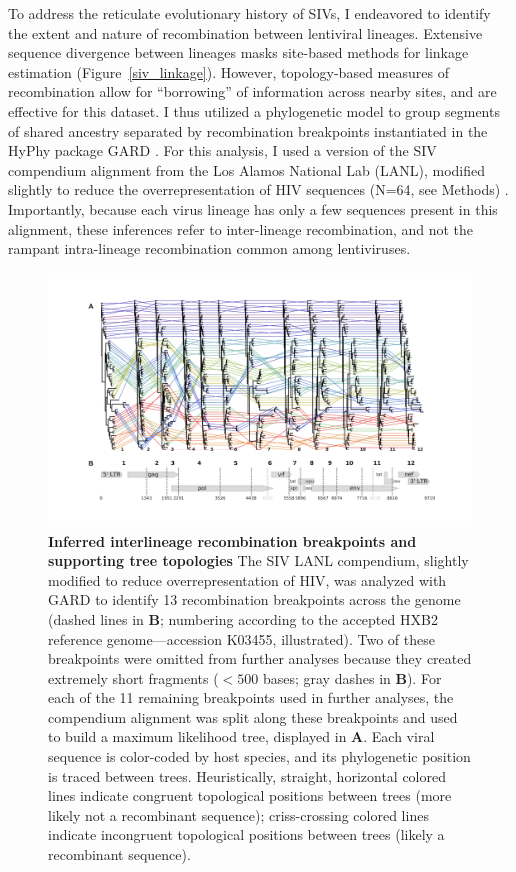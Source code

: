 To address the reticulate evolutionary history of SIVs, I endeavored to identify the extent and nature of recombination between lentiviral lineages.
Extensive sequence divergence between lineages masks site-based methods for linkage estimation (Figure~\ref{siv_linkage}).
However, topology-based measures of recombination allow for “borrowing” of information across nearby sites, and are effective for this dataset.
I thus utilized a phylogenetic model to group segments of shared ancestry separated by recombination breakpoints instantiated in the HyPhy package GARD \citep{kosakovsky2006gard}.
For this analysis, I used a version of the SIV compendium alignment from the Los Alamos National Lab (LANL), modified slightly to reduce the overrepresentation of HIV sequences (N=64, see Methods) \citep{los2012hiv}.
Importantly, because each virus lineage has only a few sequences present in this alignment, these inferences refer to inter-lineage recombination, and not the rampant intra-lineage recombination common among lentiviruses.

\begin{figure}[ht!]
  \begin{centering}
    \includegraphics[width=\linewidth]{./png/siv_recombination.png}
  	\caption[Inferred interlineage recombination breakpoints and supporting tree topologies]{\textbf{Inferred interlineage recombination breakpoints and supporting tree topologies }
The SIV LANL compendium, slightly modified to reduce overrepresentation of HIV, was analyzed with GARD to identify 13 recombination breakpoints across the genome (dashed lines in \textbf{B}; numbering according to the accepted HXB2 reference genome---accession K03455, illustrated).
Two of these breakpoints were omitted from further analyses because they created extremely short fragments ($<500$ bases; gray dashes in \textbf{B}).
For each of the 11 remaining breakpoints used in further analyses, the compendium alignment was split along these breakpoints and used to build a maximum likelihood tree, displayed in \textbf{A}.
Each viral sequence is color-coded by host species, and its phylogenetic position is traced between trees.
Heuristically, straight, horizontal colored lines indicate congruent topological positions between trees (more likely not a recombinant sequence); criss-crossing colored lines indicate incongruent topological positions between trees (likely a recombinant sequence).
}
  	\label{siv_recombination}
  \end{centering}
\end{figure}

